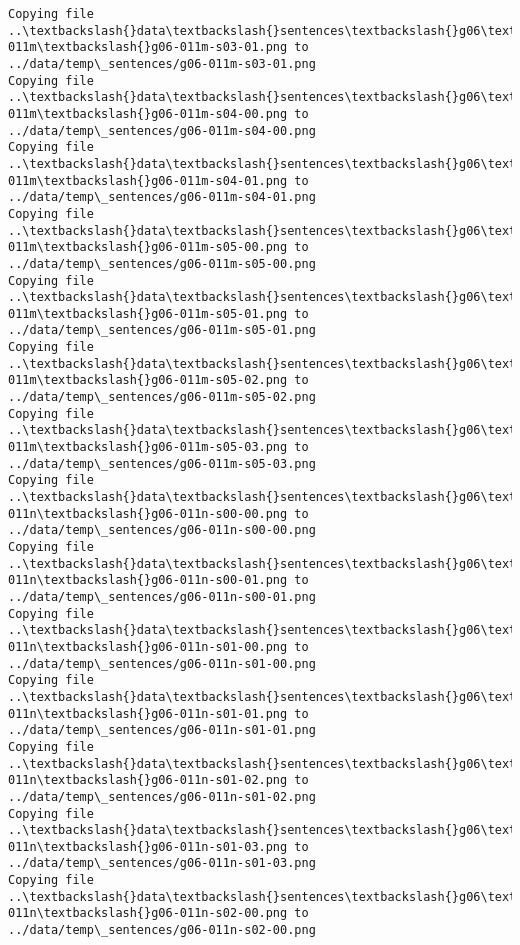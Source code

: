 \documentclass[11pt]{article}
\begin{document}
\begin{Verbatim}[commandchars=\\\{\}]
Copying file ..\textbackslash{}data\textbackslash{}sentences\textbackslash{}g06\textbackslash{}g06-011m\textbackslash{}g06-011m-s03-01.png to
../data/temp\_sentences/g06-011m-s03-01.png
Copying file ..\textbackslash{}data\textbackslash{}sentences\textbackslash{}g06\textbackslash{}g06-011m\textbackslash{}g06-011m-s04-00.png to
../data/temp\_sentences/g06-011m-s04-00.png
Copying file ..\textbackslash{}data\textbackslash{}sentences\textbackslash{}g06\textbackslash{}g06-011m\textbackslash{}g06-011m-s04-01.png to
../data/temp\_sentences/g06-011m-s04-01.png
Copying file ..\textbackslash{}data\textbackslash{}sentences\textbackslash{}g06\textbackslash{}g06-011m\textbackslash{}g06-011m-s05-00.png to
../data/temp\_sentences/g06-011m-s05-00.png
Copying file ..\textbackslash{}data\textbackslash{}sentences\textbackslash{}g06\textbackslash{}g06-011m\textbackslash{}g06-011m-s05-01.png to
../data/temp\_sentences/g06-011m-s05-01.png
Copying file ..\textbackslash{}data\textbackslash{}sentences\textbackslash{}g06\textbackslash{}g06-011m\textbackslash{}g06-011m-s05-02.png to
../data/temp\_sentences/g06-011m-s05-02.png
Copying file ..\textbackslash{}data\textbackslash{}sentences\textbackslash{}g06\textbackslash{}g06-011m\textbackslash{}g06-011m-s05-03.png to
../data/temp\_sentences/g06-011m-s05-03.png
Copying file ..\textbackslash{}data\textbackslash{}sentences\textbackslash{}g06\textbackslash{}g06-011n\textbackslash{}g06-011n-s00-00.png to
../data/temp\_sentences/g06-011n-s00-00.png
Copying file ..\textbackslash{}data\textbackslash{}sentences\textbackslash{}g06\textbackslash{}g06-011n\textbackslash{}g06-011n-s00-01.png to
../data/temp\_sentences/g06-011n-s00-01.png
Copying file ..\textbackslash{}data\textbackslash{}sentences\textbackslash{}g06\textbackslash{}g06-011n\textbackslash{}g06-011n-s01-00.png to
../data/temp\_sentences/g06-011n-s01-00.png
Copying file ..\textbackslash{}data\textbackslash{}sentences\textbackslash{}g06\textbackslash{}g06-011n\textbackslash{}g06-011n-s01-01.png to
../data/temp\_sentences/g06-011n-s01-01.png
Copying file ..\textbackslash{}data\textbackslash{}sentences\textbackslash{}g06\textbackslash{}g06-011n\textbackslash{}g06-011n-s01-02.png to
../data/temp\_sentences/g06-011n-s01-02.png
Copying file ..\textbackslash{}data\textbackslash{}sentences\textbackslash{}g06\textbackslash{}g06-011n\textbackslash{}g06-011n-s01-03.png to
../data/temp\_sentences/g06-011n-s01-03.png
Copying file ..\textbackslash{}data\textbackslash{}sentences\textbackslash{}g06\textbackslash{}g06-011n\textbackslash{}g06-011n-s02-00.png to
../data/temp\_sentences/g06-011n-s02-00.png

\end{Verbatim}
\end{document}
